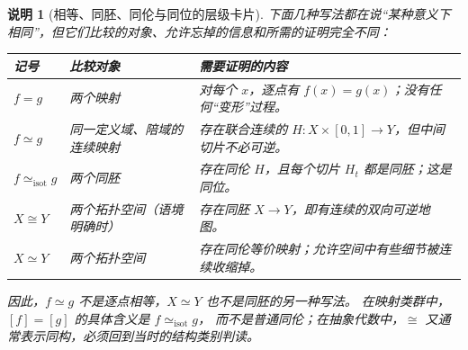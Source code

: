\documentclass[UTF8,fontset=none,a4paper,11pt]{ctexart}
\theoremstyle{foundation-definition}
\theoremstyle{foundation-theorem}
\theoremstyle{foundation-proposition}
\theoremstyle{foundation-example}
\theoremstyle{foundation-remark}
\newtheorem{remark}[definition]{说明}
\theoremstyle{foundation-theorem}
\begin{document}
\begin{remark}[相等、同胚、同伦与同位的层级卡片]\label{rem:map-equivalence-hierarchy}
下面几种写法都在说“某种意义下相同”，但它们比较的对象、允许忘掉的信息和所需的证明完全不同：
\begin{center}
\small
\begin{tabular}{@{}p{}p{}p{}@{}}
\toprule
记号 & 比较对象 & 需要证明的内容 \\
\midrule
\(f=g\) & 两个映射 & 对每个 \(x\)，逐点有 \(f(x)=g(x)\)；没有任何“变形”过程。 \\
\(f\simeq g\) & 同一定义域、陪域的连续映射 & 存在联合连续的 \(H:X\times[0,1]\to Y\)，但中间切片不必可逆。 \\
\(f\simeq_{\mathrm{isot}}g\) & 两个同胚 & 存在同伦 \(H\)，且每个切片 \(H_t\) 都是同胚；这是同位。 \\
\(X\cong Y\) & 两个拓扑空间（语境明确时） & 存在同胚 \(X\to Y\)，即有连续的双向可逆地图。 \\
\(X\simeq Y\) & 两个拓扑空间 & 存在同伦等价映射；允许空间中有些细节被连续收缩掉。 \\
\bottomrule
\end{tabular}
\end{center}
因此，\(f\simeq g\) 不是逐点相等，\(X\simeq Y\) 也不是同胚的另一种写法。
在映射类群中，\([f]=[g]\) 的具体含义是 \(f\simeq_{\mathrm{isot}}g\)，
而不是普通同伦；在抽象代数中，\(\cong\) 又通常表示同构，必须回到当时的结构类别判读。
\end{remark}
\end{document}
